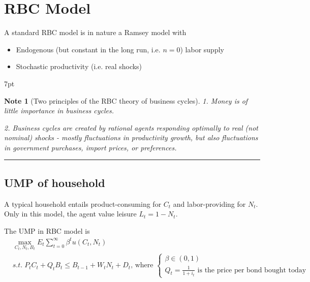 \documentclass{article}
\providecommand{\tightlist}{
  \setlength{\itemsep}{0pt}
  \setlength{\parskip}{0pt}}
\newcommand*\sepline{%
  \begin{center}
    \rule[1ex]{.5\textwidth}{.5pt}
  \end{center}}
\newenvironment{blueblock}{
\def\FrameCommand{
  \hspace{1pt}
    {\color{DarkBlue}
    \vrule width 2pt}
    {\color{blueshade}
    \vrule width 4pt}
  \colorbox{blueshade}
}
\MakeFramed{
  \advance
  \hsize-
  \width
  \FrameRestore}
\noindent\hspace{-4.55pt}%
\begin{adjustwidth}{}{7pt}
\vspace{2pt}\vspace{2pt}
}
{\vspace{2pt}\end{adjustwidth}\endMakeFramed}
\newtheorem{note}{Note}
\begin{document}
\newpage
\section{RBC Model}

A standard RBC model is in nature a Ramsey model with
\begin{itemize}
\tightlist
  \item Endogenous (but constant in the long run, i.e. $n = 0$) labor supply
  \item Stochastic productivity (i.e. real shocks)
\end{itemize}


\begin{blueblock}
\begin{note}[Two principles of the RBC theory of business cycles]

1. Money is of little importance in business cycles.

2. Business cycles are created by rational agents responding optimally to
real (not nominal) shocks - mostly fluctuations in productivity growth,
but also fluctuations in government purchases, import prices, or preferences.
\end{note}
\end{blueblock}




\sepline
\subsection{UMP of household}
A typical household entails product-consuming for $C_t$ and labor-providing for $N_t$. Only in this model, the agent value leisure $L_t=1-N_t$.

The UMP in RBC model is 
\begin{align}
&\max\limits_{C_{t},N_{t},B_{t}} E_t \sum\limits_{t=0}^{\infty}\beta^{t}u(C_{t},N_{t})
\\&
s.t. \; P_{t}C_{t}+Q_{t}B_{t}\leqslant B_{t-1}+W_{t}N_{t}+D_{t} 
\text{, where } 
\begin{cases}
\beta \in (0,1) \\
Q_{t}=\frac{1}{1+i_{t}} \text{ is the price per bond bought today}
\end{cases}
\end{align}
\end{document}
